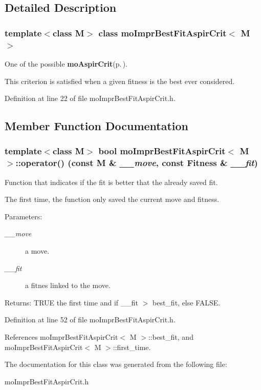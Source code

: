 \subsection{Detailed Description}
\subsubsection*{template$<$class M$>$ class mo\-Impr\-Best\-Fit\-Aspir\-Crit$<$ M $>$}

One of the possible {\bf mo\-Aspir\-Crit}{\rm (p.\,\pageref{classmo_aspir_crit})}. 

This criterion is satisfied when a given fitness is the best ever considered. 



Definition at line 22 of file mo\-Impr\-Best\-Fit\-Aspir\-Crit.h.

\subsection{Member Function Documentation}
\subsubsection{\setlength{\rightskip}{0pt plus 5cm}template$<$class M$>$ bool {\bf mo\-Impr\-Best\-Fit\-Aspir\-Crit}$<$ M $>$::operator() (const M \& {\em \_\-\_\-move}, const {\bf Fitness} \& {\em \_\-\_\-fit})\hspace{0.3cm}{\tt  [inline]}}\label{classmo_impr_best_fit_aspir_crit_53f62fb56dcae3051a741f1fddb0204b}


Function that indicates if the fit is better that the already saved fit. 

The first time, the function only saved the current move and fitness.

\begin{Desc}
\item[Parameters:]
\begin{description}
\item[{\em \_\-\_\-move}]a move. \item[{\em \_\-\_\-fit}]a fitnes linked to the move. \end{description}
\end{Desc}
\begin{Desc}
\item[Returns:]TRUE the first time and if \_\-\_\-fit $>$ best\_\-fit, else FALSE. \end{Desc}


Definition at line 52 of file mo\-Impr\-Best\-Fit\-Aspir\-Crit.h.

References mo\-Impr\-Best\-Fit\-Aspir\-Crit$<$ M $>$::best\_\-fit, and mo\-Impr\-Best\-Fit\-Aspir\-Crit$<$ M $>$::first\_\-time.

The documentation for this class was generated from the following file:\begin{CompactItemize}
\item 
mo\-Impr\-Best\-Fit\-Aspir\-Crit.h\end{CompactItemize}
